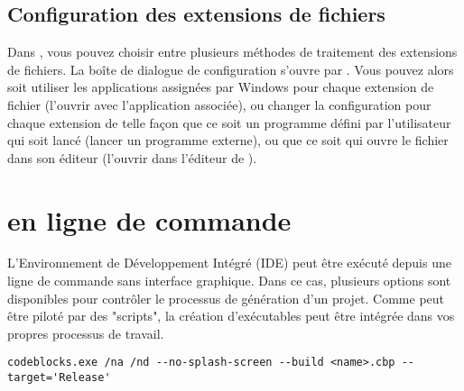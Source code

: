 \subsection{Configuration des extensions de fichiers}\label{sec:file_extension}

Dans \codeblocks, vous pouvez choisir entre plusieurs méthodes de traitement des extensions de fichiers. La boîte de dialogue de configuration s'ouvre par .
Vous pouvez alors soit utiliser les applications assignées par Windows pour chaque extension de fichier (l'ouvrir avec l'application associée), ou changer la configuration pour chaque extension de telle façon que ce soit un programme défini par l'utilisateur qui soit lancé (lancer un programme externe), ou que ce soit \codeblocks qui ouvre le fichier dans son éditeur (l'ouvrir dans l'éditeur de \codeblocks).


\section{\codeblocks en ligne de commande}

L'Environnement de Développement Intégré (IDE) \codeblocks peut être exécuté depuis une ligne de commande sans interface graphique. Dans ce cas, plusieurs options sont disponibles pour contrôler le processus de génération d'un projet. Comme \codeblocks peut être piloté par des "scripts", la création d'exécutables peut être intégrée dans vos propres processus de travail.

\begin{lstlisting}
codeblocks.exe /na /nd --no-splash-screen --build <name>.cbp --target='Release'
\end{lstlisting}

